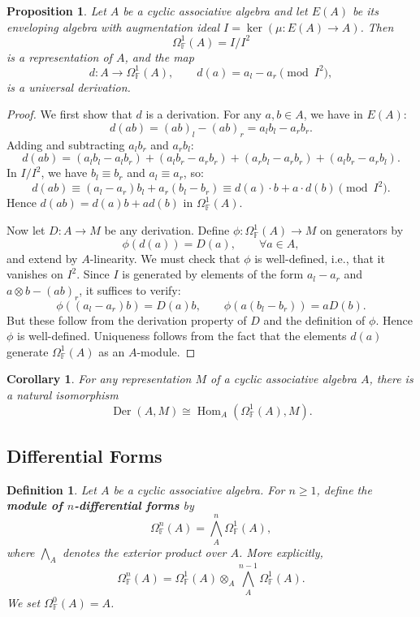 \documentclass[pdflatex,sn-mathphys-num]{sn-jnl}%
\theoremstyle{thmstyleone}%
\newtheorem{proposition}[theorem]{Proposition}%
\newtheorem{definition}{Definition}[section]
\newtheorem{corollary}{Corollary}[section]
\theoremstyle{thmstyletwo}%
\theoremstyle{thmstylethree}%
\begin{document}
\begin{proposition}\label{prop:universal_derivation}
Let $A$ be a cyclic associative algebra and let $E(A)$ be its enveloping algebra with augmentation ideal $I = \ker(\mu: E(A) \to A)$. Then
\[
\Omega^1_{\mathbb{F}}(A) = I / I^2
\]
is a representation of $A$, and the map
\[
d: A \to \Omega^1_{\mathbb{F}}(A), \qquad d(a) = a_l - a_r \pmod{I^2},
\]
is a universal derivation.
\end{proposition}

\begin{proof}
We first show that $d$ is a derivation. For any $a, b \in A$, we have in $E(A)$:
\[
d(ab) = (ab)_l - (ab)_r = a_l b_l - a_r b_r.
\]
Adding and subtracting $a_l b_r$ and $a_r b_l$:
\[
d(ab) = (a_l b_l - a_l b_r) + (a_l b_r - a_r b_r) + (a_r b_l - a_r b_r) + (a_l b_r - a_r b_l).
\]
In $I/I^2$, we have $b_l \equiv b_r$ and $a_l \equiv a_r$, so:
\[
d(ab) \equiv (a_l - a_r) b_l + a_r (b_l - b_r) \equiv d(a) \cdot b + a \cdot d(b) \pmod{I^2}.
\]
Hence $d(ab) = d(a) b + a d(b)$ in $\Omega^1_{\mathbb{F}}(A)$.

Now let $D: A \to M$ be any derivation. Define $\phi: \Omega^1_{\mathbb{F}}(A) \to M$ on generators by
\[
\phi(d(a)) = D(a), \qquad \forall a \in A,
\]
and extend by $A$-linearity. We must check that $\phi$ is well-defined, i.e., that it vanishes on $I^2$. Since $I$ is generated by elements of the form $a_l - a_r$ and $a \otimes b - (ab)_r$, it suffices to verify:
\[
\phi((a_l - a_r) b) = D(a) b, \qquad \phi(a (b_l - b_r)) = a D(b).
\]
But these follow from the derivation property of $D$ and the definition of $\phi$. Hence $\phi$ is well-defined. Uniqueness follows from the fact that the elements $d(a)$ generate $\Omega^1_{\mathbb{F}}(A)$ as an $A$-module. 
\end{proof}

\begin{corollary}\label{cor:der_hom}
For any representation $M$ of a cyclic associative algebra $A$, there is a natural isomorphism
\[
\operatorname{Der}(A, M) \cong \operatorname{Hom}_A(\Omega^1_{\mathbb{F}}(A), M).
\]
\end{corollary}

\subsection{Differential Forms}

\begin{definition}\label{def:differential_forms}
Let $A$ be a cyclic associative algebra. For $n \ge 1$, define the \textbf{module of $n$-differential forms} by
\[
\Omega^n_{\mathbb{F}}(A) = \bigwedge^n_A \Omega^1_{\mathbb{F}}(A),
\]
where $\bigwedge_A$ denotes the exterior product over $A$. More explicitly,
\[
\Omega^n_{\mathbb{F}}(A) = \Omega^1_{\mathbb{F}}(A) \otimes_A \bigwedge_A^{n-1} \Omega^1_{\mathbb{F}}(A).
\]
We set $\Omega^0_{\mathbb{F}}(A) = A$.
\end{definition}
\end{document}
